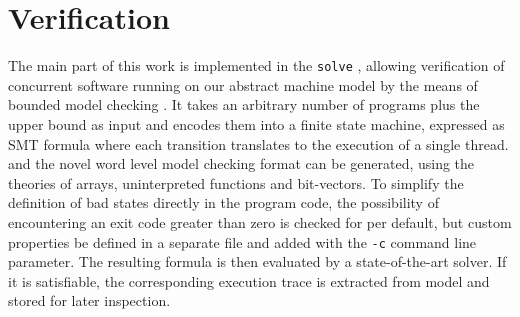 \section{Verification}

The main part of this work is implemented in the \texttt{solve} ,
allowing verification of concurrent software running on our abstract machine model by the means of bounded model checking \cite{ref:BMC}.
It takes an arbitrary number of programs plus the upper bound \CHANGE{$\BOUND$} as input and encodes them into a finite state machine, expressed as  SMT formula where each transition translates to the execution of a single thread.
{\SMTLIB} \cite{ref:SMT-Lib} and the novel {\BTOR} \cite{ref:BTOR2} word level model checking format can be generated, using the theories of arrays, uninterpreted functions and bit-vectors.
To simplify the definition of bad states directly in the program code, the possibility of encountering an exit code greater than zero is checked for per default, but custom properties  be defined in a separate file and added with the \texttt{-c} command line parameter.
The resulting formula is then evaluated by a state-of-the-art  solver.
If it is satisfiable, the corresponding execution trace is extracted from  model and stored for later inspection.


